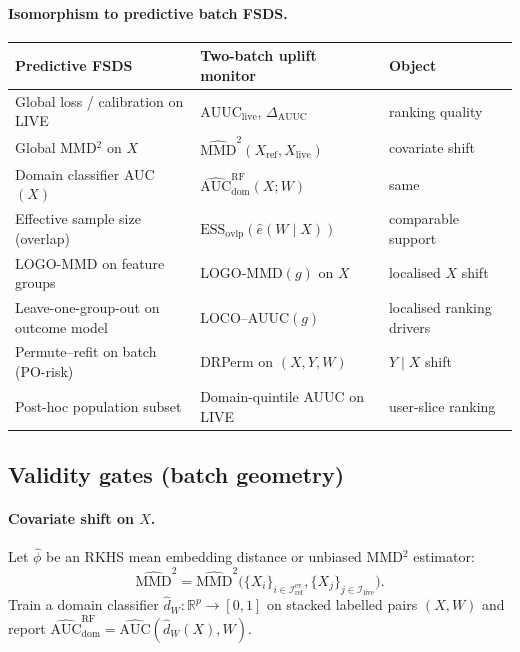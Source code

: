 \paragraph{Isomorphism to predictive batch FSDS.}
\begin{center}
\small
\begin{tabular}{@{}lll@{}}
\toprule
\textbf{Predictive FSDS} & \textbf{Two-batch uplift monitor} & \textbf{Object} \\
\midrule
Global loss / calibration on LIVE & $\mathrm{AUUC}_{\mathrm{live}}$, $\Delta_{\mathrm{AUUC}}$ & ranking quality \\
Global MMD$^2$ on $X$ & $\widehat{\mathrm{MMD}}^2(X_{\mathrm{ref}},X_{\mathrm{live}})$ & covariate shift \\
Domain classifier AUC$(X)$ & $\widehat{\mathrm{AUC}}_{\mathrm{dom}}^{\mathrm{RF}}(X;W)$ & same \\
Effective sample size (overlap) & $\mathrm{ESS}_{\mathrm{ovlp}}(\hat e(W\mid X))$ & comparable support \\
LOGO-MMD on feature groups & LOGO-MMD$(g)$ on $X$ & localised $X$ shift \\
Leave-one-group-out on outcome model & LOCO--AUUC$(g)$ & localised ranking drivers \\
Permute--refit on batch (PO-risk) & DRPerm on $(X,Y,W)$ & $Y\mid X$ shift \\
Post-hoc population subset & Domain-quintile AUUC on LIVE & user-slice ranking \\
\bottomrule
\end{tabular}
\end{center}

\subsection{Validity gates (batch geometry)}

\paragraph{Covariate shift on $X$.}
Let $\hat{\phi}$ be an RKHS mean embedding distance or unbiased MMD$^2$ estimator:
\[
  \widehat{\mathrm{MMD}}^2
  = \widehat{\mathrm{MMD}}^2\bigl(\{X_i\}_{i\in\mathcal{I}_{\mathrm{ref}}^{\mathrm{ev}}},
  \{X_j\}_{j\in\mathcal{I}_{\mathrm{live}}}\bigr).
\]
Train a domain classifier $\hat d_W:\mathbb{R}^p\to[0,1]$ on stacked labelled pairs $(X,W)$ and report
$\widehat{\mathrm{AUC}}_{\mathrm{dom}}^{\mathrm{RF}}=\widehat{\mathrm{AUC}}(\hat d_W(X),W)$.


